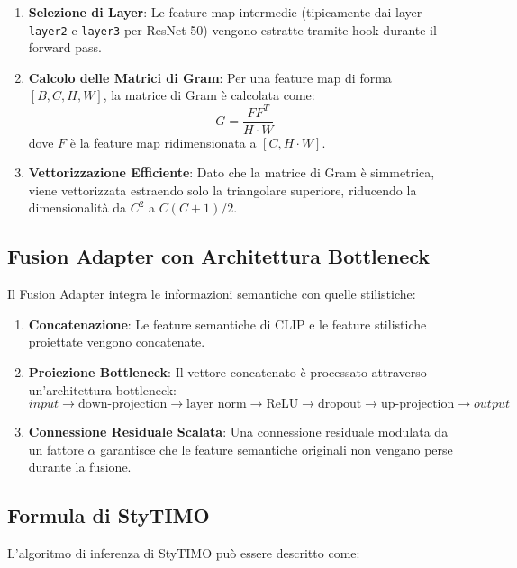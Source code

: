 \documentclass[11pt,a4paper]{article}
\begin{document}
\begin{enumerate}
    \item \textbf{Selezione di Layer}: Le feature map intermedie (tipicamente dai layer \texttt{layer2} e \texttt{layer3} per ResNet-50) vengono estratte tramite hook durante il forward pass.
    
    \item \textbf{Calcolo delle Matrici di Gram}: Per una feature map di forma $[B,C,H,W]$, la matrice di Gram è calcolata come:
    \[G = \frac{FF^T}{H \cdot W}\]
    dove $F$ è la feature map ridimensionata a $[C, H \cdot W]$.
    
    \item \textbf{Vettorizzazione Efficiente}: Dato che la matrice di Gram è simmetrica, viene vettorizzata estraendo solo la triangolare superiore, riducendo la dimensionalità da $C^2$ a $C(C+1)/2$.
\end{enumerate}

\subsection{Fusion Adapter con Architettura Bottleneck}
Il Fusion Adapter integra le informazioni semantiche con quelle stilistiche:

\begin{enumerate}
    \item \textbf{Concatenazione}: Le feature semantiche di CLIP e le feature stilistiche proiettate vengono concatenate.
    
    \item \textbf{Proiezione Bottleneck}: Il vettore concatenato è processato attraverso un'architettura bottleneck:
    \[input \rightarrow \text{down-projection} \rightarrow \text{layer norm} \rightarrow \text{ReLU} \rightarrow \text{dropout} \rightarrow \text{up-projection} \rightarrow output\]
    
    \item \textbf{Connessione Residuale Scalata}: Una connessione residuale modulata da un fattore $\alpha$ garantisce che le feature semantiche originali non vengano perse durante la fusione.
\end{enumerate}

\subsection{Formula di StyTIMO}
L'algoritmo di inferenza di StyTIMO può essere descritto come:
\end{document}

